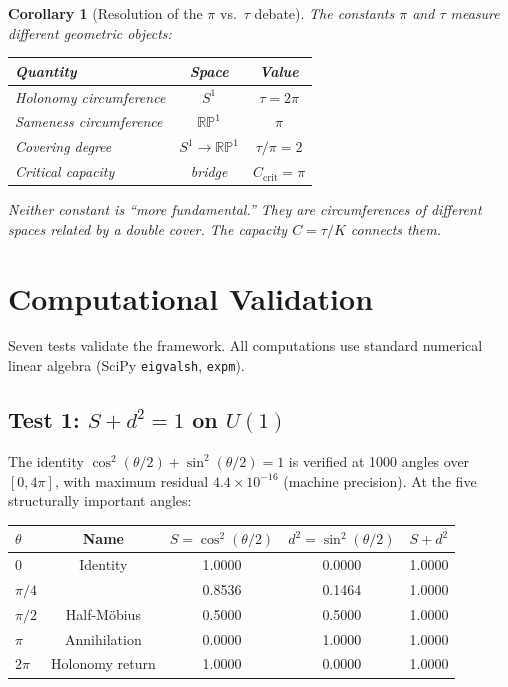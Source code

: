 \documentclass[11pt,letterpaper]{article}
\newtheorem{corollary}[theorem]{Corollary}
\begin{document}
\begin{corollary}[Resolution of the $\pi$ vs.\ $\tau$ debate]\label{cor:pitau}
The constants $\pi$ and $\tau$ measure different geometric objects:
\begin{center}
\begin{tabular}{lcc}
\toprule
Quantity & Space & Value \\
\midrule
Holonomy circumference & $S^1$ & $\tau = 2\pi$ \\
Sameness circumference & $\mathbb{RP}^1$ & $\pi$ \\
Covering degree & $S^1 \to \mathbb{RP}^1$ & $\tau/\pi = 2$ \\
Critical capacity & bridge & $C_{\text{crit}} = \pi$ \\
\bottomrule
\end{tabular}
\end{center}
Neither constant is ``more fundamental.'' They are circumferences of different spaces related by a double cover. The capacity $C = \tau/K$ connects them.
\end{corollary}


\section{Computational Validation}

Seven tests validate the framework. All computations use standard numerical linear algebra (SciPy \texttt{eigvalsh}, \texttt{expm}).

\subsection{Test 1: $S + d^2 = 1$ on $U(1)$}

The identity $\cos^2(\theta/2) + \sin^2(\theta/2) = 1$ is verified at 1000 angles over $[0, 4\pi]$, with maximum residual $4.4 \times 10^{-16}$ (machine precision). At the five structurally important angles:

\begin{center}
\begin{tabular}{lcccc}
\toprule
$\theta$ & Name & $S = \cos^2(\theta/2)$ & $d^2 = \sin^2(\theta/2)$ & $S + d^2$ \\
\midrule
$0$ & Identity & 1.0000 & 0.0000 & 1.0000 \\
$\pi/4$ & & 0.8536 & 0.1464 & 1.0000 \\
$\pi/2$ & Half-M\"obius & 0.5000 & 0.5000 & 1.0000 \\
$\pi$ & Annihilation & 0.0000 & 1.0000 & 1.0000 \\
$2\pi$ & Holonomy return & 1.0000 & 0.0000 & 1.0000 \\
\bottomrule
\end{tabular}
\end{center}
\end{document}
